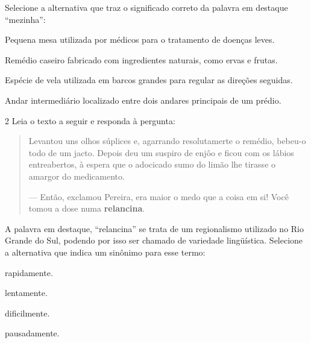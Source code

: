 Selecione a alternativa que traz o significado correto da palavra em destaque ``mezinha'':

\begin{escolha}
\item Pequena mesa utilizada por médicos para o tratamento de doenças leves.

\item Remédio caseiro fabricado com ingredientes naturais, como ervas e frutas.

\item Espécie de vela utilizada em barcos grandes para regular as direções seguidas.

\item Andar intermediário localizado entre dois andares principais de um prédio.
\end{escolha}


\num{2} Leia o texto a seguir e responda à pergunta:

\begin{quote}
Levantou uns olhos súplices e, agarrando resolutamerte o remédio,
bebeu-o todo de um jacto. Depois deu um suspiro de enjôo e ficou com os
lábios entreabertos, à espera que o adocicado sumo do limão lhe tirasse
o amargor do medicamento.

--- Então, exclamou Pereira, era maior o medo que a coisa em si! Você
tomou a dose numa \textbf{relancina}.

\end{quote}

A palavra em destaque, ``relancina'' se trata de um regionalismo
utilizado no Rio Grande do Sul, podendo por isso ser chamado de
variedade lingüística. Selecione a alternativa que indica um sinônimo
para esse termo:

\begin{escolha}
\item rapidamente.

\item lentamente.

\item dificilmente.

\item pausadamente.
\end{escolha}

